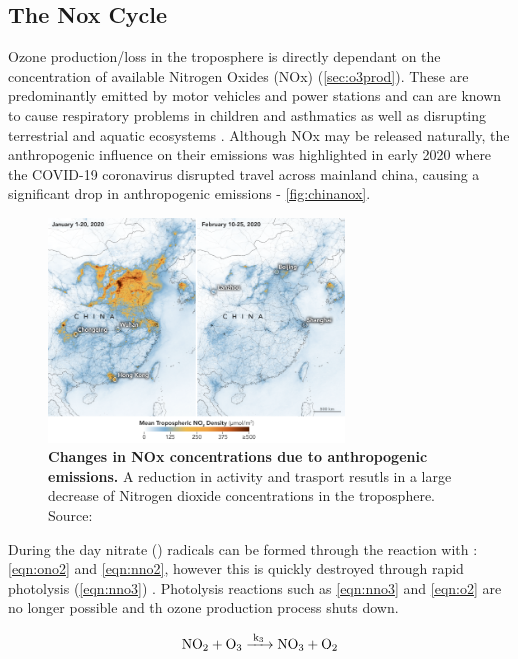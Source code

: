 \subsection{The Nox Cycle}\label{sec:noxcycle}
Ozone production/loss in the troposphere is directly dependant on the concentration of available Nitrogen Oxides (NOx) (\autoref{sec:o3prod}). These are predominantly emitted by motor vehicles and power stations and can are known to cause respiratory problems in children and asthmatics as well as disrupting terrestrial and aquatic ecosystems \citep{eea}. Although NOx may be released naturally, the anthropogenic influence on their emissions was highlighted in early 2020 where the COVID-19 coronavirus disrupted travel across mainland china, causing a significant drop in anthropogenic emissions - \autoref{fig:chinanox}.

\begin{figure}[H]
    \centering
    \includegraphics[width=0.7\textwidth]{china_trop_2020056.png}
    \caption{\textbf{Changes in NOx concentrations due to anthropogenic emissions.} A reduction in activity and trasport resutls in a large decrease of Nitrogen dioxide concentrations in the troposphere. Source: \citep{chinanox}}
    \label{fig:chinanox}
\end{figure}

During the day nitrate () radicals can be formed through the reaction with : \autoref{eqn:ono2} and \autoref{eqn:nno2}, however this is quickly destroyed through rapid photolysis (\autoref{eqn:nno3}) \citep{nitrate}. Photolysis reactions such as \autoref{eqn:nno3} and \autoref{eqn:o2} are no longer possible and th ozone production process shuts down.

\begin{equation}
  \ce{NO2 + O3 ->[k3] NO3 + O2}
  \label{eqn:nno2}
\end{equation}

